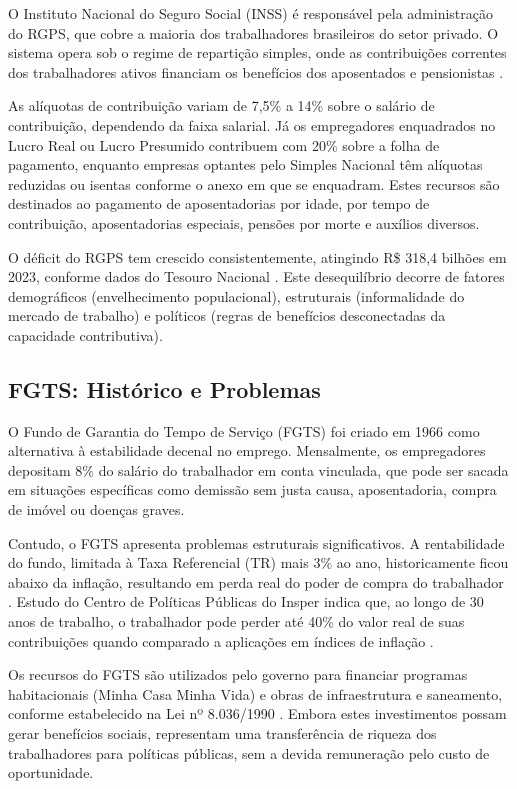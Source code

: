 O Instituto Nacional do Seguro Social (INSS) é responsável pela administração do RGPS, que cobre a maioria dos trabalhadores brasileiros do setor privado. O sistema opera sob o regime de repartição simples, onde as contribuições correntes dos trabalhadores ativos financiam os benefícios dos aposentados e pensionistas \cite{gentil2006}.

As alíquotas de contribuição variam de 7,5\% a 14\% sobre o salário de contribuição, dependendo da faixa salarial. Já os empregadores enquadrados no Lucro Real ou Lucro Presumido contribuem com 20\% sobre a folha de pagamento, enquanto empresas optantes pelo Simples Nacional têm alíquotas reduzidas ou isentas conforme o anexo em que se enquadram. Estes recursos são destinados ao pagamento de aposentadorias por idade, por tempo de contribuição, aposentadorias especiais, pensões por morte e auxílios diversos.

O déficit do RGPS tem crescido consistentemente, atingindo R\$ 318,4 bilhões em 2023, conforme dados do Tesouro Nacional \cite{tesouro2024}. Este desequilíbrio decorre de fatores demográficos (envelhecimento populacional), estruturais (informalidade do mercado de trabalho) e políticos (regras de benefícios desconectadas da capacidade contributiva).

\subsection{FGTS: Histórico e Problemas}

O Fundo de Garantia do Tempo de Serviço (FGTS) foi criado em 1966 como alternativa à estabilidade decenal no emprego. Mensalmente, os empregadores depositam 8\% do salário do trabalhador em conta vinculada, que pode ser sacada em situações específicas como demissão sem justa causa, aposentadoria, compra de imóvel ou doenças graves.

Contudo, o FGTS apresenta problemas estruturais significativos. A rentabilidade do fundo, limitada à Taxa Referencial (TR) mais 3\% ao ano, historicamente ficou abaixo da inflação, resultando em perda real do poder de compra do trabalhador \cite{afonso2016}. Estudo do Centro de Políticas Públicas do Insper indica que, ao longo de 30 anos de trabalho, o trabalhador pode perder até 40\% do valor real de suas contribuições quando comparado a aplicações em índices de inflação \cite{insper2019}.

Os recursos do FGTS são utilizados pelo governo para financiar programas habitacionais (Minha Casa Minha Vida) e obras de infraestrutura e saneamento, conforme estabelecido na Lei nº 8.036/1990 \cite{brasil1990fgts}. Embora estes investimentos possam gerar benefícios sociais, representam uma transferência de riqueza dos trabalhadores para políticas públicas, sem a devida remuneração pelo custo de oportunidade.

